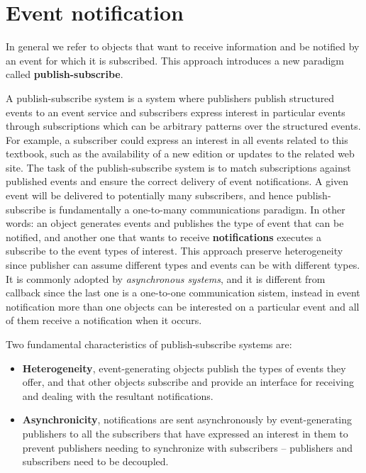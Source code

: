 \documentclass[11pt,a4paper]{article}
\begin{document}
\section{Event notification}
In general we refer to objects that want to receive information and be notified by an event for which it is subscribed. This approach introduces a new paradigm called \textbf{publish-subscribe}.


A publish-subscribe system is a system where publishers publish structured events to an event service and subscribers express interest in particular events through subscriptions which can be arbitrary patterns over the structured events. For example, a subscriber could express an interest in all events related to this textbook, such as the availability of a new edition or updates to the related web site. The task of the publish-subscribe system is to match subscriptions against published events and ensure the correct delivery of event notifications. A given event will be delivered to potentially many subscribers, and hence publish-subscribe is fundamentally a one-to-many communications paradigm.
In other words: an object generates events and publishes the type of event that can be notified, and another one that wants to receive \textbf{notifications} executes a subscribe to the event types of interest. 
This approach preserve heterogeneity since publisher can assume different types and events can be with different types. It is commonly adopted by \textit{asynchronous systems}, and it is different from callback since the last one is a one-to-one communication sistem, instead in event notification more than one objects can be interested on a particular event and all of them receive a notification when it occurs.


Two fundamental characteristics of publish-subscribe systems are:
\begin{itemize}
	\item \textbf{Heterogeneity}, event-generating objects publish the types of events they offer, and that other objects subscribe and provide an interface for receiving and dealing with the resultant notifications.
	\item \textbf{Asynchronicity}, notifications are sent asynchronously by event-generating publishers to all the subscribers that have expressed an interest in them to prevent publishers needing to synchronize with subscribers – publishers and subscribers need to be decoupled.
\end{itemize}  
\end{document}
